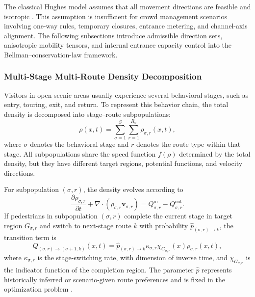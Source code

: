 \documentclass[lettersize,journal]{IEEEtran}
\begin{document}
The classical Hughes model assumes that all movement directions are feasible and isotropic \cite{hughes2003}.
This assumption is insufficient for crowd management scenarios involving one-way rules, temporary closures, entrance metering, and channel-axis alignment.
The following subsections introduce admissible direction sets, anisotropic mobility tensors, and internal entrance capacity control into the Bellman--conservation-law framework.

\subsubsection{Multi-Stage Multi-Route Density Decomposition}

Visitors in open scenic areas usually experience several behavioral stages, such as entry, touring, exit, and return.
To represent this behavior chain, the total density is decomposed into stage--route subpopulations:
\begin{equation}
\rho(x,t) = \sum_{\sigma=1}^{S} \sum_{r=1}^{R_\sigma} \rho_{\sigma,r}(x,t),
\label{eq:density_decomp}
\end{equation}
where $\sigma$ denotes the behavioral stage and $r$ denotes the route type within that stage.
All subpopulations share the speed function $f(\rho)$ determined by the total density, but they have different target regions, potential functions, and velocity directions.

For subpopulation $(\sigma,r)$, the density evolves according to
\begin{equation}
\frac{\partial \rho_{\sigma,r}}{\partial t}
+ \nabla \cdot (\rho_{\sigma,r}\mathbf v_{\sigma,r})
= Q^{\mathrm{in}}_{\sigma,r}-Q^{\mathrm{out}}_{\sigma,r}.
\label{eq:subpop_continuity}
\end{equation}
If pedestrians in subpopulation $(\sigma,r)$ complete the current stage in target region $G_{\sigma,r}$ and switch to next-stage route $k$ with probability $\hat p_{(\sigma,r)\to k}$, the transition term is
\begin{equation}
Q_{(\sigma,r)\to(\sigma+1,k)}(x,t)
=
\hat p_{(\sigma,r)\to k}
\kappa_{\sigma,r}
\chi_{G_{\sigma,r}}(x)
\rho_{\sigma,r}(x,t),
\label{eq:transition}
\end{equation}
where $\kappa_{\sigma,r}$ is the stage-switching rate, with dimension of inverse time, and $\chi_{G_{\sigma,r}}$ is the indicator function of the completion region.
The parameter $\hat p$ represents historically inferred or scenario-given route preferences and is fixed in the optimization problem \cite{RN2302,RN2301,RN2303}.
\end{document}
